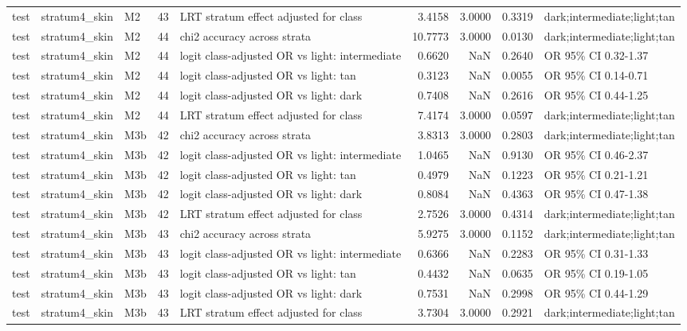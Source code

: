 \begin{tabular}{lllrlrrrl}
test & stratum4\_skin & M2 & 43 & LRT stratum effect adjusted for class & 3.4158 & 3.0000 & 0.3319 & dark;intermediate;light;tan \\
test & stratum4\_skin & M2 & 44 & chi2 accuracy across strata & 10.7773 & 3.0000 & 0.0130 & dark;intermediate;light;tan \\
test & stratum4\_skin & M2 & 44 & logit class-adjusted OR vs light: intermediate & 0.6620 & NaN & 0.2640 & OR 95\% CI 0.32-1.37 \\
test & stratum4\_skin & M2 & 44 & logit class-adjusted OR vs light: tan & 0.3123 & NaN & 0.0055 & OR 95\% CI 0.14-0.71 \\
test & stratum4\_skin & M2 & 44 & logit class-adjusted OR vs light: dark & 0.7408 & NaN & 0.2616 & OR 95\% CI 0.44-1.25 \\
test & stratum4\_skin & M2 & 44 & LRT stratum effect adjusted for class & 7.4174 & 3.0000 & 0.0597 & dark;intermediate;light;tan \\
test & stratum4\_skin & M3b & 42 & chi2 accuracy across strata & 3.8313 & 3.0000 & 0.2803 & dark;intermediate;light;tan \\
test & stratum4\_skin & M3b & 42 & logit class-adjusted OR vs light: intermediate & 1.0465 & NaN & 0.9130 & OR 95\% CI 0.46-2.37 \\
test & stratum4\_skin & M3b & 42 & logit class-adjusted OR vs light: tan & 0.4979 & NaN & 0.1223 & OR 95\% CI 0.21-1.21 \\
test & stratum4\_skin & M3b & 42 & logit class-adjusted OR vs light: dark & 0.8084 & NaN & 0.4363 & OR 95\% CI 0.47-1.38 \\
test & stratum4\_skin & M3b & 42 & LRT stratum effect adjusted for class & 2.7526 & 3.0000 & 0.4314 & dark;intermediate;light;tan \\
test & stratum4\_skin & M3b & 43 & chi2 accuracy across strata & 5.9275 & 3.0000 & 0.1152 & dark;intermediate;light;tan \\
test & stratum4\_skin & M3b & 43 & logit class-adjusted OR vs light: intermediate & 0.6366 & NaN & 0.2283 & OR 95\% CI 0.31-1.33 \\
test & stratum4\_skin & M3b & 43 & logit class-adjusted OR vs light: tan & 0.4432 & NaN & 0.0635 & OR 95\% CI 0.19-1.05 \\
test & stratum4\_skin & M3b & 43 & logit class-adjusted OR vs light: dark & 0.7531 & NaN & 0.2998 & OR 95\% CI 0.44-1.29 \\
test & stratum4\_skin & M3b & 43 & LRT stratum effect adjusted for class & 3.7304 & 3.0000 & 0.2921 & dark;intermediate;light;tan \\

\end{tabular}
